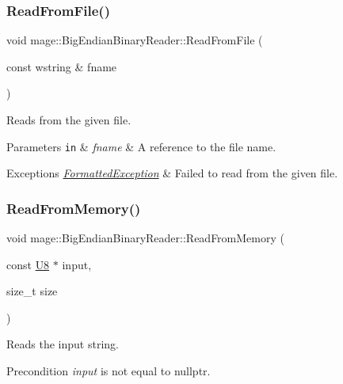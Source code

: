 \subsubsection{\texorpdfstring{Read\+From\+File()}{ReadFromFile()}}
{\footnotesize\ttfamily void mage\+::\+Big\+Endian\+Binary\+Reader\+::\+Read\+From\+File (\begin{DoxyParamCaption}\item[{const wstring \&}]{fname }\end{DoxyParamCaption})}

Reads from the given file.


\begin{DoxyParams}[1]{Parameters}
\mbox{\tt in}  & {\em fname} & A reference to the file name. \\
\hline
\end{DoxyParams}

\begin{DoxyExceptions}{Exceptions}
{\em \hyperlink{classmage_1_1_formatted_exception}{Formatted\+Exception}} & Failed to read from the given file. \\
\hline
\end{DoxyExceptions}
\hypertarget{classmage_1_1_big_endian_binary_reader_a44d2529136499412cdaf9ad5d1cf0e59}{}\label{classmage_1_1_big_endian_binary_reader_a44d2529136499412cdaf9ad5d1cf0e59} 
\subsubsection{\texorpdfstring{Read\+From\+Memory()}{ReadFromMemory()}}
{\footnotesize\ttfamily void mage\+::\+Big\+Endian\+Binary\+Reader\+::\+Read\+From\+Memory (\begin{DoxyParamCaption}\item[{const \hyperlink{namespacemage_afc638980bc6154f15af5e2d93a0e0ea9}{U8} $\ast$}]{input,  }\item[{size\+\_\+t}]{size }\end{DoxyParamCaption})}

Reads the input string.

\begin{DoxyPrecond}{Precondition}
{\itshape input} is not equal to {\ttfamily nullptr}. 
\end{DoxyPrecond}

